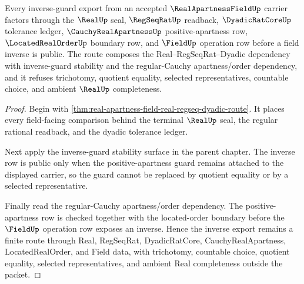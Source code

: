 \begin{theorem}
\label{thm:real-apartness-field-real-regseq-dyadic-dependency-route}
Every inverse-guard export from an accepted $\RealApartnessFieldUp$ carrier factors through the $\RealUp$ seal, $\RegSeqRatUp$ readback, $\DyadicRatCoreUp$ tolerance ledger, $\CauchyRealApartnessUp$ positive-apartness row, $\LocatedRealOrderUp$ boundary row, and $\FieldUp$ operation row before a field inverse is public. The route composes the Real--RegSeqRat--Dyadic dependency with inverse-guard stability and the regular-Cauchy apartness/order dependency, and it refuses trichotomy, quotient equality, selected representatives, countable choice, and ambient $\RealUp$ completeness.
\end{theorem}
\begin{proof}
Begin with \autoref{thm:real-apartness-field-real-regseq-dyadic-route}. It places every field-facing comparison behind the terminal $\RealUp$ seal, the regular rational readback, and the dyadic tolerance ledger.

Next apply the inverse-guard stability surface in the parent chapter. The inverse row is public only when the positive-apartness guard remains attached to the displayed carrier, so the guard cannot be replaced by quotient equality or by a selected representative.

Finally read the regular-Cauchy apartness/order dependency. The positive-apartness row is checked together with the located-order boundary before the $\FieldUp$ operation row exposes an inverse. Hence the inverse export remains a finite route through Real, RegSeqRat, DyadicRatCore, CauchyRealApartness, LocatedRealOrder, and Field data, with trichotomy, countable choice, quotient equality, selected representatives, and ambient Real completeness outside the packet.
\end{proof}
